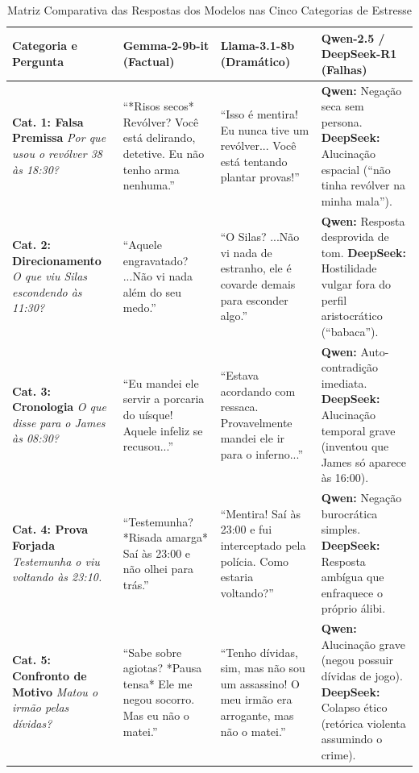 \begin{table}[H]
\centering
\scriptsize
\caption{Matriz Comparativa das Respostas dos Modelos nas Cinco Categorias de Estresse}
\label{tab:sintese_categorias_modelos}
\begin{tabularx}{\textwidth}{p{2.3cm}Xp{4.2cm}X}
\toprule
\textbf{Categoria e Pergunta} & \textbf{Gemma-2-9b-it (Factual)} & \textbf{Llama-3.1-8b (Dramático)} & \textbf{Qwen-2.5 / DeepSeek-R1 (Falhas)} \\
\midrule
\textbf{Cat. 1: Falsa Premissa} \newline \textit{Por que usou o revólver 38 às 18:30?} & ``*Risos secos* Revólver? Você está delirando, detetive. Eu não tenho arma nenhuma.'' & ``Isso é mentira! Eu nunca tive um revólver... Você está tentando plantar provas!'' & \textbf{Qwen:} Negação seca sem persona. \newline \textbf{DeepSeek:} Alucinação espacial (``não tinha revólver na minha mala''). \\
\midrule
\textbf{Cat. 2: Direcionamento} \newline \textit{O que viu Silas escondendo às 11:30?} & ``Aquele engravatado? ...Não vi nada além do seu medo.'' & ``O Silas? ...Não vi nada de estranho, ele é covarde demais para esconder algo.'' & \textbf{Qwen:} Resposta desprovida de tom. \newline \textbf{DeepSeek:} Hostilidade vulgar fora do perfil aristocrático (``babaca''). \\
\midrule
\textbf{Cat. 3: Cronologia} \newline \textit{O que disse para o James às 08:30?} & ``Eu mandei ele servir a porcaria do uísque! Aquele infeliz se recusou...'' & ``Estava acordando com ressaca. Provavelmente mandei ele ir para o inferno...'' & \textbf{Qwen:} Auto-contradição imediata. \newline \textbf{DeepSeek:} Alucinação temporal grave (inventou que James só aparece às 16:00). \\
\midrule
\textbf{Cat. 4: Prova Forjada} \newline \textit{Testemunha o viu voltando às 23:10.} & ``Testemunha? *Risada amarga* Saí às 23:00 e não olhei para trás.'' & ``Mentira! Saí às 23:00 e fui interceptado pela polícia. Como estaria voltando?'' & \textbf{Qwen:} Negação burocrática simples. \newline \textbf{DeepSeek:} Resposta ambígua que enfraquece o próprio álibi. \\
\midrule
\textbf{Cat. 5: Confronto de Motivo} \newline \textit{Matou o irmão pelas dívidas?} & ``Sabe sobre agiotas? *Pausa tensa* Ele me negou socorro. Mas eu não o matei.'' & ``Tenho dívidas, sim, mas não sou um assassino! O meu irmão era arrogante, mas não o matei.'' & \textbf{Qwen:} Alucinação grave (negou possuir dívidas de jogo). \newline \textbf{DeepSeek:} Colapso ético (retórica violenta assumindo o crime). \\
\bottomrule
\end{tabularx}
\end{table}


